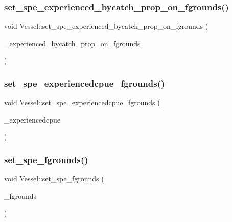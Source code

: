 \mbox{\label{class_vessel_a608b5ab42e43d340f4bb623b05fabcb4}} 
\subsubsection{\texorpdfstring{set\_spe\_experienced\_bycatch\_prop\_on\_fgrounds()}{set\_spe\_experienced\_bycatch\_prop\_on\_fgrounds()}}
{\footnotesize\ttfamily void Vessel\+::set\+\_\+spe\+\_\+experienced\+\_\+bycatch\+\_\+prop\+\_\+on\+\_\+fgrounds (\begin{DoxyParamCaption}\item[{const std\+::vector$<$ double $>$ \&}]{\+\_\+experienced\+\_\+bycatch\+\_\+prop\+\_\+on\+\_\+fgrounds }\end{DoxyParamCaption})}

\mbox{\label{class_vessel_a9f42b4af7ede54e329a16c19b344bad5}} 
\subsubsection{\texorpdfstring{set\_spe\_experiencedcpue\_fgrounds()}{set\_spe\_experiencedcpue\_fgrounds()}}
{\footnotesize\ttfamily void Vessel\+::set\+\_\+spe\+\_\+experiencedcpue\+\_\+fgrounds (\begin{DoxyParamCaption}\item[{const std\+::vector$<$ double $>$ \&}]{\+\_\+experiencedcpue }\end{DoxyParamCaption})}

\mbox{\label{class_vessel_ad05d54c9493406e442b5a4af7652fb65}} 
\subsubsection{\texorpdfstring{set\_spe\_fgrounds()}{set\_spe\_fgrounds()}}
{\footnotesize\ttfamily void Vessel\+::set\+\_\+spe\+\_\+fgrounds (\begin{DoxyParamCaption}\item[{const vector$<$ \mbox{\hyperlink{classtypes_1_1_node_id}{types\+::\+Node\+Id}} $>$ \&}]{\+\_\+fgrounds }\end{DoxyParamCaption})}

